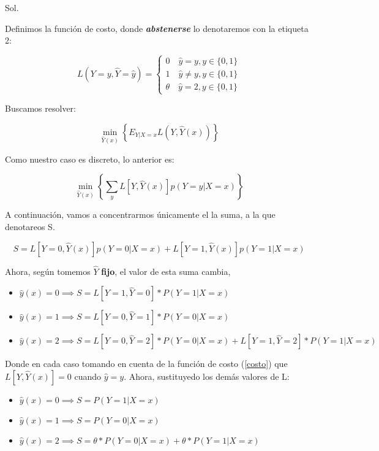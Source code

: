 \documentclass[letter, 11pt, twoside]{report}
\begin{document}
{\color{mirosa}Sol.}

Definimos la función de costo, donde \textbf{\textit{abstenerse}} lo denotaremos con la etiqueta 2:

\begin{equation}
    L( Y=y,\hat{Y}= \hat{y}) =\begin{cases}0\quad \hat{y}=y, y\in\{0,1\} \\
        1 \quad \hat{y}\neq y, y\in\{0,1\}\\
        \theta \quad \hat{y}=2, y\in\{0,1\}\end{cases}
        \label{costo}
\end{equation}

Buscamos resolver:

\begin{equation*}
    \min _{\hat{Y}(x) }\left\{ E_{Y|X=x}L\left( Y,\hat{Y}(x) \right)\right\} 
\end{equation*}

Como nuestro caso es discreto, lo anterior es:

\begin{equation*}
    \min _{\hat{Y}(x) }\left\{ \sum_{y}L\left[Y,\hat{Y}(x)\right]  p\left(Y=y|X=x\right)\right\} 
\end{equation*}

A continuación, vamos a concentrarmos únicamente el la suma, a la que denotareos S.

\begin{equation*}
    S=L\left[Y=0,\hat{Y}(x)\right]  p\left(Y=0|X=x\right) + L\left[Y=1,\hat{Y}(x)\right]  p\left(Y=1|X=x\right)
\end{equation*}

Ahora, según tomemos $\hat{Y}$ \textbf{fijo}, el valor de esta suma cambia, 

\begin{itemize}
    \item $\hat{y}(x)=0\implies S=L[Y=1,\hat{Y}=0]*P(Y=1|X=x)$
    \item $\hat{y}(x)=1\implies S=L[Y=0,\hat{Y}=1]*P(Y=0|X=x)$
    \item $\hat{y}(x)=2\implies S=L[Y=0,\hat{Y}=2]*P(Y=0|X=x)+L[Y=1,\hat{Y}=2]*P(Y=1|X=x)$
\end{itemize}

Donde en cada caso tomando en cuenta de la función de costo (\ref{costo}) que $L\left[Y,\hat{Y}(x)\right]=0$ cuando $\hat{y}=y$.
Ahora, sustituyedo los demás valores de L:


\begin{itemize}
    \item $\hat{y}(x)=0\implies S=P(Y=1|X=x)$
    \item $\hat{y}(x)=1\implies S=P(Y=0|X=x)$
    \item $\hat{y}(x)=2\implies S=\theta*P(Y=0|X=x)+\theta*P(Y=1|X=x)$
\end{itemize}
\end{document}
